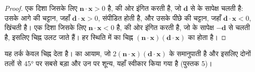 \begin{proof}
एक दिशा जिसके लिए $\mathbf n\cdot\mathbf x > 0$ है,  की ओर इंगित करती है, जो $\mathbf d$ से  के सापेक्ष चलती है: उसके आगे की चट्टान, जहाँ $\mathbf d\cdot\mathbf x > 0$, संपीडित होती है, और उसके पीछे की चट्टान, जहाँ $\mathbf d\cdot\mathbf x < 0$, खिंचती है। एक दिशा जिसके लिए $\mathbf n\cdot\mathbf x < 0$ है,  की ओर इंगित करती है, जो  के सापेक्ष $-\mathbf d$ से चलती है, इसलिए चिह्न उलट जाते हैं। हर स्थिति में  का चिह्न $(\mathbf n\cdot\mathbf x)(\mathbf
d\cdot\mathbf x)$ का होता है।
\end{proof}

यह तर्क केवल चिह्न देता है।  का आयाम, जो $2(\mathbf n\cdot\mathbf x)(\mathbf d\cdot\mathbf x)$ के समानुपाती है और इसलिए दोनों तलों से \ang{45} पर सबसे बड़ा और उन पर शून्य, यहाँ स्वीकार किया गया है (पुस्तक 5)।

